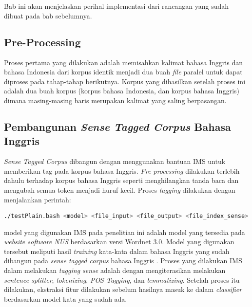 \chapter{\babEmpat} \label{implementasi}
Bab ini akan menjelaskan perihal implementasi dari rancangan yang sudah dibuat pada bab sebelumnya.

\section{Pre-Processing}
Proses pertama yang dilakukan adalah memisahkan kalimat bahasa Inggris dan bahasa Indonesia dari korpus identik menjadi dua buah \textit{file} paralel untuk dapat diproses pada tahap-tahap berikutnya. Korpus yang dihasilkan setelah proses ini adalah dua buah korpus (korpus bahasa Indonesia, dan korpus bahasa Inggris) dimana masing-masing baris merupakan kalimat yang saling berpasangan.


\section{Pembangunan \textit{Sense Tagged Corpus} Bahasa Inggris}
\textit{Sense Tagged Corpus} dibangun dengan menggunakan bantuan IMS untuk memberikan tag pada korpus bahasa Inggris. \textit{Pre-processing} dilakukan terlebih dahulu terhadap korpus bahasa Inggris seperti menghilangkan tanda baca dan mengubah semua token menjadi huruf kecil. Proses \textit{tagging} dilakukan dengan menjalankan perintah:

\begin{lstlisting}[language=bash, caption={\textit{Tagging} korpus bahasa Inggris dengan IMS}, label={IMS}]
./testPlain.bash <model> <file_input> <file_output> <file_index_sense>
\end{lstlisting}

model yang digunakan IMS pada penelitian ini adalah model yang tersedia pada \textit{website software NUS} berdasarkan versi Wordnet 3.0. Model yang digunakan tersebut meliputi hasil \textit{training} kata-kata dalam bahasa Inggris yang sudah dibangun pada \textit{sense tagged corpus} bahasa Inggris \citep{taghipour2015one}. Proses yang dilakukan IMS dalam melakukan \textit{tagging sense} adalah dengan mengiterasikan melakukan \textit{sentence splitter}, \textit{tokenizing}, \textit{POS Tagging}, dan \textit{lemmatizing}. Setelah proses itu dilakukan, ekstraksi fitur dilakukan sebelum hasilnya masuk ke dalam \textit{classifier} berdasarkan model kata yang sudah ada. 


